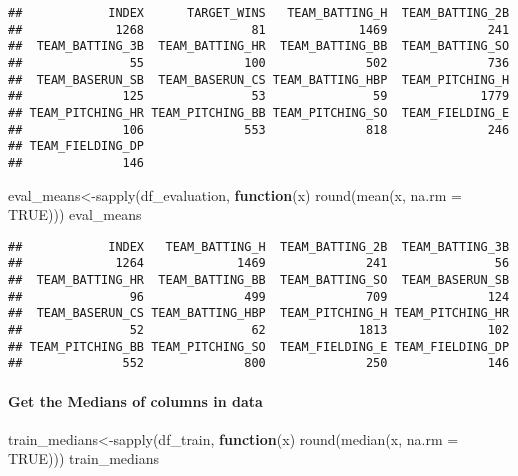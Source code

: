 \documentclass[
]{article}
\newenvironment{Shaded}{\begin{snugshade}}{\end{snugshade}}
\newcommand{\AttributeTok}[1]{\textcolor[rgb]{0.77,0.63,0.00}{#1}}
\newcommand{\ConstantTok}[1]{\textcolor[rgb]{0.00,0.00,0.00}{#1}}
\newcommand{\ControlFlowTok}[1]{\textcolor[rgb]{0.13,0.29,0.53}{\textbf{#1}}}
\newcommand{\FunctionTok}[1]{\textcolor[rgb]{0.00,0.00,0.00}{#1}}
\newcommand{\NormalTok}[1]{#1}
\newcommand{\OtherTok}[1]{\textcolor[rgb]{0.56,0.35,0.01}{#1}}
\begin{document}
\begin{verbatim}
##            INDEX      TARGET_WINS   TEAM_BATTING_H  TEAM_BATTING_2B 
##             1268               81             1469              241 
##  TEAM_BATTING_3B  TEAM_BATTING_HR  TEAM_BATTING_BB  TEAM_BATTING_SO 
##               55              100              502              736 
##  TEAM_BASERUN_SB  TEAM_BASERUN_CS TEAM_BATTING_HBP  TEAM_PITCHING_H 
##              125               53               59             1779 
## TEAM_PITCHING_HR TEAM_PITCHING_BB TEAM_PITCHING_SO  TEAM_FIELDING_E 
##              106              553              818              246 
## TEAM_FIELDING_DP 
##              146
\end{verbatim}

\begin{Shaded}
\begin{Highlighting}[]
\NormalTok{eval\_means}\OtherTok{\textless{}{-}}\FunctionTok{sapply}\NormalTok{(df\_evaluation, }\ControlFlowTok{function}\NormalTok{(x) }\FunctionTok{round}\NormalTok{(}\FunctionTok{mean}\NormalTok{(x, }\AttributeTok{na.rm =} \ConstantTok{TRUE}\NormalTok{)))}
\NormalTok{eval\_means}
\end{Highlighting}
\end{Shaded}

\begin{verbatim}
##            INDEX   TEAM_BATTING_H  TEAM_BATTING_2B  TEAM_BATTING_3B 
##             1264             1469              241               56 
##  TEAM_BATTING_HR  TEAM_BATTING_BB  TEAM_BATTING_SO  TEAM_BASERUN_SB 
##               96              499              709              124 
##  TEAM_BASERUN_CS TEAM_BATTING_HBP  TEAM_PITCHING_H TEAM_PITCHING_HR 
##               52               62             1813              102 
## TEAM_PITCHING_BB TEAM_PITCHING_SO  TEAM_FIELDING_E TEAM_FIELDING_DP 
##              552              800              250              146
\end{verbatim}

\hypertarget{get-the-medians-of-columns-in-data}{%
\paragraph{\texorpdfstring{\textbf{Get the Medians of columns in
data}}{Get the Medians of columns in data}}\label{get-the-medians-of-columns-in-data}}

\begin{Shaded}
\begin{Highlighting}[]
\NormalTok{train\_medians}\OtherTok{\textless{}{-}}\FunctionTok{sapply}\NormalTok{(df\_train, }\ControlFlowTok{function}\NormalTok{(x) }\FunctionTok{round}\NormalTok{(}\FunctionTok{median}\NormalTok{(x, }\AttributeTok{na.rm =} \ConstantTok{TRUE}\NormalTok{)))}
\NormalTok{train\_medians}
\end{Highlighting}
\end{Shaded}
\end{document}
